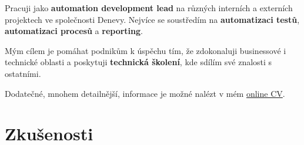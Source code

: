 \documentclass[cv_cz.tex]{subfiles}
\begin{document}

\newcommand\minitab[2][l]{\begin{tabular}[b]{#1}#2\end{tabular}}
\newcommand\tnode[2][left]{\tikz[baseline=(n.center)]\node(n)[inner sep=0,outer sep=0,align=#1]{#2};}
\newcommand*{\cventrylogo}[8][.25em]{
  \begin{tabular*}{\textwidth}{l@{\extracolsep{\fill}}r}%
    \tnode{\minitab[l]{
      {\bfseries #4} \\ {\itshape #3\ifthenelse{\equal{#7}{}}{}{, #7}}
    }}
    & 
    \tnode[right]{\minitab[r]{{\bfseries #6} \\ {\itshape #2} \\ #5}} 
      \\%
  \end{tabular*}%
  \ifx&#8&%
    \else{\\\vbox{\small#8}}\fi%
  \par\addvspace{#1}}


\vspace*{-8mm}

Pracuji jako \textbf{automation development lead} na různých interních a externích projektech ve společnosti Denevy. Nejvíce se soustředím na \textbf{automatizaci testů}, \textbf{automatizaci procesů} a \textbf{reporting}. \\

\vspace*{-3mm}

Mým cílem je pomáhat podnikům k úspěchu tím, že zdokonaluji businessové i technické oblasti a poskytuji \textbf{technická školení}, kde sdílím své znalosti s ostatními. \\

\vspace*{-3mm}

Dodatečné, mnohem detailnější, informace je možné nalézt v mém \href{https://dominik-97.github.io/curriculum-vitae/index_cz.html}{\color[RGB]{69,114,174}online CV}.

\section{Zkušenosti}

\end{document}
